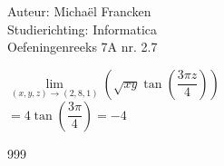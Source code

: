 \documentclass[a4paper]{article}
\begin{document}
\noindent \large Auteur: Michaël Francken \\
\noindent \large Studierichting: Informatica\\
\noindent \large Oefeningenreeks 7A nr. 2.7\\

\medskip

\normalsize

$\lim\limits_{\left(x,y,z\right)\rightarrow\left(2,8,1\right)} \left(\sqrt{xy}\tan\left(\dfrac{3\pi z}{4}\right)\right)$\\

$=4\tan\left(\dfrac{3\pi}{4}\right) = -4$\\

\begin{thebibliography}{999}
\end{thebibliography}
\end{document}
